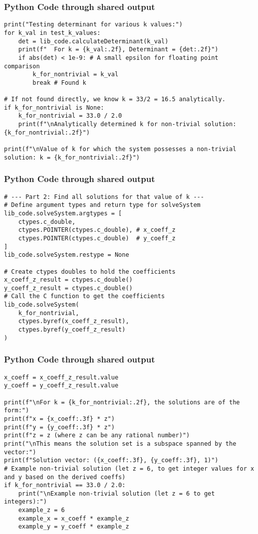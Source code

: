 \documentclass{beamer}
\begin{document}
\begin{frame}[fragile]
\frametitle{Python Code through shared output}
\begin{lstlisting}
print("Testing determinant for various k values:")
for k_val in test_k_values:
    det = lib_code.calculateDeterminant(k_val)
    print(f"  For k = {k_val:.2f}, Determinant = {det:.2f}")
    if abs(det) < 1e-9: # A small epsilon for floating point comparison
        k_for_nontrivial = k_val
        break # Found k

# If not found directly, we know k = 33/2 = 16.5 analytically.
if k_for_nontrivial is None:
    k_for_nontrivial = 33.0 / 2.0
    print(f"\nAnalytically determined k for non-trivial solution: {k_for_nontrivial:.2f}")

print(f"\nValue of k for which the system possesses a non-trivial solution: k = {k_for_nontrivial:.2f}")
\end{lstlisting}
 \end{frame}

\begin{frame}[fragile]
\frametitle{Python Code through shared output}
\begin{lstlisting}
# --- Part 2: Find all solutions for that value of k ---
# Define argument types and return type for solveSystem
lib_code.solveSystem.argtypes = [
    ctypes.c_double,
    ctypes.POINTER(ctypes.c_double), # x_coeff_z
    ctypes.POINTER(ctypes.c_double)  # y_coeff_z
]
lib_code.solveSystem.restype = None

# Create ctypes doubles to hold the coefficients
x_coeff_z_result = ctypes.c_double()
y_coeff_z_result = ctypes.c_double()
# Call the C function to get the coefficients
lib_code.solveSystem(
    k_for_nontrivial,
    ctypes.byref(x_coeff_z_result),
    ctypes.byref(y_coeff_z_result)
)
\end{lstlisting}
 \end{frame}

\begin{frame}[fragile]
\frametitle{Python Code through shared output}
\begin{lstlisting}
x_coeff = x_coeff_z_result.value
y_coeff = y_coeff_z_result.value

print(f"\nFor k = {k_for_nontrivial:.2f}, the solutions are of the form:")
print(f"x = {x_coeff:.3f} * z")
print(f"y = {y_coeff:.3f} * z")
print(f"z = z (where z can be any rational number)")
print("\nThis means the solution set is a subspace spanned by the vector:")
print(f"Solution vector: ({x_coeff:.3f}, {y_coeff:.3f}, 1)")
# Example non-trivial solution (let z = 6, to get integer values for x and y based on the derived coeffs)
if k_for_nontrivial == 33.0 / 2.0:
    print("\nExample non-trivial solution (let z = 6 to get integers):")
    example_z = 6
    example_x = x_coeff * example_z
    example_y = y_coeff * example_z
\end{lstlisting}
 \end{frame}
\end{document}

